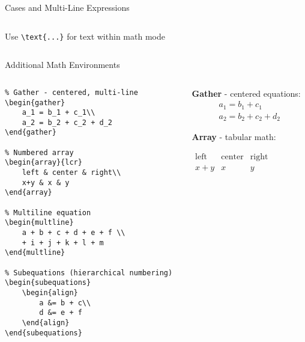 \begin{frame}[fragile]{Cases and Multi-Line Expressions}
\begin{columns}
\begin{column}{0.5\textwidth}
            \begin{tip}
                Use \texttt{\textbackslash text\{...\}} for text within math mode
            \end{tip}
        \end{column}
    \end{columns}
\end{frame}

\begin{frame}[fragile]{Additional Math Environments}
    \begin{columns}
        \begin{column}{0.5\textwidth}
            \begin{lstlisting}
% Gather - centered, multi-line
\begin{gather}
    a_1 = b_1 + c_1\\
    a_2 = b_2 + c_2 + d_2
\end{gather}

% Numbered array
\begin{array}{lcr}
    left & center & right\\
    x+y & x & y
\end{array}

% Multiline equation
\begin{multline}
    a + b + c + d + e + f \\
    + i + j + k + l + m
\end{multline}

% Subequations (hierarchical numbering)
\begin{subequations}
    \begin{align}
        a &= b + c\\
        d &= e + f
    \end{align}
\end{subequations}
            \end{lstlisting}
        \end{column}
        
        \begin{column}{0.5\textwidth}
            \textbf{Gather} - centered equations:
            \begin{gather}
                a_1 = b_1 + c_1\\
                a_2 = b_2 + c_2 + d_2
            \end{gather}
            
            \textbf{Array} - tabular math:
            \begin{center}
                $\begin{array}{lcr}
                    \text{left} & \text{center} & \text{right}\\
                    x+y & x & y
                \end{array}$
            \end{center}
            

\end{column}
\end{columns}
\end{frame}
